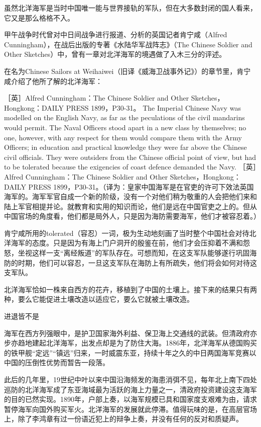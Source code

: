\documentclass[12pt,UTF8]{ctexbook}
\begin{document}
虽然北洋海军是当时中国唯一能与世界接轨的军队，但在大多数封闭的国人看来，它又是那么格格不入。

甲午战争时代曾对中日间战争进行报道、分析的英国记者肯宁咸（Alfred Cunningham），在战后出版的专著《水陆华军战阵志》（The Chinese Soldier and Other Sketches）中，曾有一章对北洋海军的境遇做了入木三分的评述。

在名为Chinese Sailors at Weihaiwei（旧译《威海卫战事外记》）的章节里，肯宁咸介绍了他所了解的北洋海军：

［英］Alfred Cunningham：The Chinese Soldier and Other Sketches，Hongkong：DAILY PRESS 1899，P30-31。
The Imperial Chinese Navy was modelled on the English Navy, as far as the peculations of the civil mandarins would permit. The Naval Officers stood apart in a new class by themselves; no one, however, with any respect for them would compare them with the Army Officers; in education and practical knowledge they were far above the Chinese civil officials. They were outsiders from the Chinese official point of view, but had to be tolerated because the exigencies of coast defence demanded the Navy. ［英］Alfred Cunningham：The Chinese Soldier and Other Sketches，Hongkong：DAILY PRESS 1899，P30-31。（译为：皇家中国海军是在官吏的许可下效法英国海军的。海军军官自成一个新的阶级，没有一个对他们稍为敬重的人会把他们来和陆上军官相提并论。就教育和实用的知识而论，他们是远在中国官吏之上的。但从中国官场的角度看，他们都是局外人，只是因为海防需要海军，他们才被容忍着。）

肯宁咸所用的tolerated（容忍）一词，极为生动地刻画了当时整个中国社会对待北洋海军的态度。只是因为有海上门户洞开的殷鉴在前，他们才会压抑着不满和怨怒，坐视这样一支“离经叛道”的军队存在。可想而知，在这支军队能够遂行巩固海防的时期，他们可以容忍，一旦这支军队在海防上有所疏失，他们将会如何对待这支军队。

北洋海军恰如一株来自西方的花卉，移植到了中国的土壤上。接下来的结果只有两种，要么它能促进土壤改造以适应它，要么它就被土壤改造。

进退皆不是

海军在西方列强眼中，是护卫国家海外利益、保卫海上交通线的武装。但清政府亦步亦趋地建起北洋海军，出发点却是为了防住大海。1886年，北洋海军从德国购买的铁甲舰“定远”“镇远”归来，一时威震东亚，持续十年之久的中日两国海军竞赛以中国的压倒性优势而暂告一段落。

此后的几年里，19世纪中叶以来中国沿海频发的海患消弭不见，每年北上南下四处巡防的北洋海军成了东亚海域最为活跃的海上力量之一，清政府投资建设这支海军的目的已然实现。1890年，户部上奏，以海军规模已具和国家度支艰难为由，请求暂停海军向国外购买军火。北洋海军的发展就此停滞。值得玩味的是，在高层官场上，除了李鸿章有过一份语近犯上的辩争上奏，并没有任何的反对和质疑声。
\end{document}
